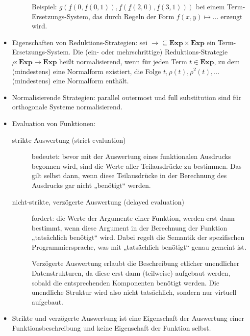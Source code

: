 \documentclass[
  a4paper,
  11pt,
]{scrartcl}
\begin{document}
\begin{itemize}
\begin{description}
        Beispiel: $g(\underline{f}(0, \underline{f}(0, 1)),
        \underline{f}(\underline{f}(2, 0), \underline{f}(3,1)))$ bei einem
        Term-Ersetzungs-System, das durch Regeln der Form $f(x,y) \mapsto \dots$
        erzeugt wird.
    \end{description}

  \item Eigenschaften von Reduktions-Strategien: sei $\rightarrow \subseteq
    \textbf{Exp} \times \textbf{Exp}$ ein Term-Ersetzungs-System. Die (ein- oder
    mehrschrittige) Reduktions-Strategie $\rho: \textbf{Exp} \rightarrow
    \textbf{Exp}$ heißt normalisierend, wenn für jeden Term $t \in
    \textbf{Exp}$, zu dem (mindestens) eine Normalform existiert, die Folge $t,
    \rho(t), \rho^2(t), \dots$ (mindestens) eine Normalform enthält.

  \item Normalisierende Strategien: parallel outermost und full substitution
    sind für orthogonale Systeme normalisierend.

  \item Evaluation von Funktionen:
    \begin{description}
      \item[strikte Auswertung (strict evaluation)] bedeutet: bevor mit der
        Auswertung eines funktionalen Ausdrucks begonnen wird, sind die Werte
        aller Teilausdrücke zu bestimmen. Das gilt selbst dann, wenn diese
        Teilausdrücke in der Berechnung des Ausdrucks gar nicht „benötigt“
        werden.

      \item[nicht-strikte, verzögerte Auswertung (delayed evaluation)] fordert:
        die Werte der Argumente einer Funktion, werden erst dann bestimmt, wenn
        diese Argument in der Berechnung der Funktion „tatsächlich benötigt“
        wird. Dabei regelt die Semantik der spezifischen Programmiersprache, was
        mit „tatsächlich benötigt“ genau gemeint ist.

        Verzögerte Auswertung erlaubt die Beschreibung etlicher unendlicher
        Datenstrukturen, da diese erst dann (teilweise) aufgebaut werden, sobald
        die entsprechenden Komponenten benötigt werden. Die unendliche Struktur
        wird also nicht tatsächlich, sondern nur virtuell aufgebaut.
    \end{description}

  \item Strikte und verzögerte Auswertung ist eine Eigenschaft der Auswertung
    einer Funktionsbeschreibung und keine Eigenschaft der Funktion selbst.
\end{itemize}
\end{document}
